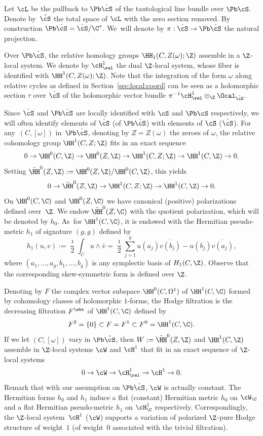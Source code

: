 Let $\cL$ be the pullback to $\Pb\hat\cS$ of the tautological line bundle over $\Pb\cS$.
Denote by~$\hat\cS$ the total space of $\cL$ with the zero section removed.
By construction $\Pb\hat\cS=\hat\cS/\C^*$.
We~will denote by $\pi:\hat\cS\to\Pb\hat\cS$ the natural projection.

Over $\Pb\hat\cS$, the relative homology groups $\HH_1 (C, Z(\omega); \Z)$ assemble in a $\Z$-local system.
We denote by $\cH_{\rel}^1$ the dual $\Z$-local system, whose fiber is identified with $\HH^1(C,Z(\omega);\Z)$.
Note that the integration of the form $\omega$ along relative cycles as defined in Section~\ref{sec:local:coord} can be seen as a holomorphic section $\tau$ over $\hat\cS$ of the holomorphic vector bundle $\pi^{-1}\cH_{\rel}^1 \otimes_{\Z} \Ocal_{\hat\cS}$.

Since $\hat{\cS}$ and $\Pb\hat{\cS}$ are locally identified with $\cS$ and $\Pb\cS$ respectively, we will often identify elements of $\hat\cS$ (\resp of $\Pb\hat\cS$) with elements of $\cS$ (\resp $\hat{\cS}$).
For any~$(C, [\omega])$ in~$\Pb\hat\cS $, denoting by $Z = Z(\omega)$ the zeroes of $\omega$, the relative cohomology group $\HH^1 (C, Z; \Z)$ fits in an exact sequence
\[ 0 \to \HH^0(C, \Z) \to \HH^0(Z, \Z) \to \HH^1(C, Z; \Z) \to \HH^1(C, \Z) \to 0.\]
Setting $\tilde \HH^0(Z, \Z) := \HH^0(Z, \Z) / \HH^0(C, \Z)$, this yields
\begin{equation}\label{eq:Hodge:mixed:ex:seq}
0 \to \tilde \HH^0(Z, \Z) \to \HH^1(C, Z; \Z) \to \HH^1(C, \Z) \to 0.
\end{equation}
On $\HH^0(C, \C)$ and $\HH^0(Z, \C)$ we have canonical (positive) polarizations defined over~$\Z$. We endow $\tilde \HH^0(Z, \C)$ with the quotient polarization, which will be denoted by $h_0$. As~for $\HH^1(C, \C)$, it is endowed with the Hermitian pseudo-metric $h_1$ of signature $(g,g)$ defined by
\[
h_1(u,v) := \frac\imath2\int_C u \wedge \bar v=\frac{\imath}{2}\sum_{j=1}^g u(a_j)\overline{v(b_j)} - u(b_j)\overline{v(a_j)},
\]
where $(a_1,\dots,a_g,b_1,\dots,b_g)$ is any symplectic basis of $H_1(C,\Z)$.
Observe that the corresponding skew-symmetric form is defined over $\Z$.

Denoting by $F$ the complex vector subspace $\HH^0(C, \Omega^1)$ of $ \HH^1(C, \C)$ formed by cohomology classes of holomorphic $1$-forms, the Hodge filtration is the decreasing filtration $F^{\sbt}$ of $\HH^1(C, \C)$ defined by
\[ F^{2} = \{0\} \subset F = F^1 \subset F^0 = \HH^1(C, \C).\]
If we let $(C, [\omega])$ vary in $\Pb\hat\cS$, then $W:=\tilde \HH^0(Z, \Z)$ and $\HH^1(C, \Z)$ assemble in $\Z$-local systems $\cW$ and $\cH^1$ that fit in an exact sequence of $\Z$-local systems
\[ 0 \to \cW \to \cH^1_{\rel} \to \cH^1 \to 0.\]
Remark that with our assumption on $\Pb\hat\cS$, $\cW$ is actually constant. The Hermitian forms $h_0$ and $h_1$ induce a flat (constant) Hermitian metric $h_0$ on $\cW_{\C}$ and a flat Hermitian pseudo-metric $h_1$ on $\cH^1_{\C}$ respectively. Correspondingly, the $\Z$-local system~$\cH^1$ (\resp $\cW$) supports a variation of polarized $\Z$-pure Hodge structure of weight~$1$ (\resp of weight~$0$ associated with the trivial filtration).

